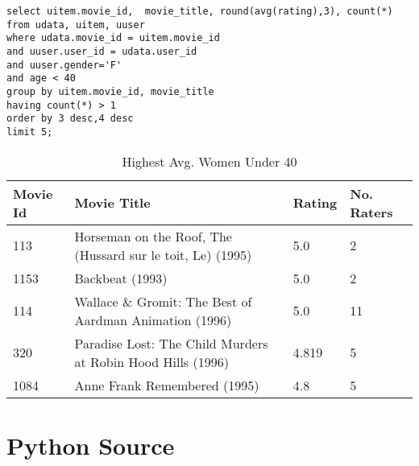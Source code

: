 \documentclass[letterpaper,11pt]{report}
\begin{document}
\begin{savenotes}
\begin{enumerate}
\begin{verbatim}
select uitem.movie_id,  movie_title, round(avg(rating),3), count(*) 
from udata, uitem, uuser 
where udata.movie_id = uitem.movie_id 
and uuser.user_id = udata.user_id 
and uuser.gender='F' 
and age < 40 
group by uitem.movie_id, movie_title 
having count(*) > 1 
order by 3 desc,4 desc 
limit 5;
\end{verbatim}

\begin{table}[htbp]
\centering
    \begin{tabular}{|l|l|l|l|}
    \hline
    Movie Id & Movie Title                                                 & Rating & No. Raters \\ \hline
    113      & Horseman on the Roof, The (Hussard sur le toit, Le) (1995)  & 5.0    & 2          \\ \hline
    1153     & Backbeat (1993)                                             & 5.0    & 2          \\ \hline
    114      & Wallace \& Gromit: The Best of Aardman Animation (1996)     & 5.0    & 11         \\ \hline
    320      & Paradise Lost: The Child Murders at Robin Hood Hills (1996) & 4.819  & 5          \\ \hline
    1084     & Anne Frank Remembered (1995)                                & 4.8    & 5          \\ \hline
    \end{tabular}
    \caption {Highest Avg. Women Under 40}
\end{table}
\end{enumerate}



\end{savenotes}




\appendix
{}

\chapter{Python Source} \label{chap:python}

\end{document}
